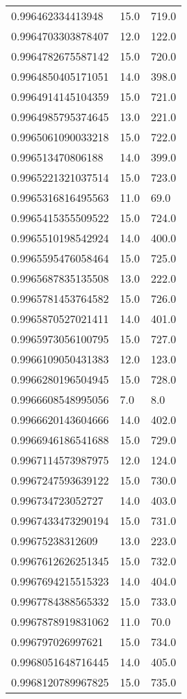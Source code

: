 \begin{center}
\begin{supertabular}[H]{p{0.30\textwidth}p{0.05\textwidth}p{0.05\textwidth}}
0.996462334413948 & 15.0 & 719.0 \\ 
0.9964703303878407 & 12.0 & 122.0 \\ 
0.9964782675587142 & 15.0 & 720.0 \\ 
0.9964850405171051 & 14.0 & 398.0 \\ 
0.9964914145104359 & 15.0 & 721.0 \\ 
0.9964985795374645 & 13.0 & 221.0 \\ 
0.9965061090033218 & 15.0 & 722.0 \\ 
0.996513470806188 & 14.0 & 399.0 \\ 
0.9965221321037514 & 15.0 & 723.0 \\ 
0.9965316816495563 & 11.0 & 69.0 \\ 
0.9965415355509522 & 15.0 & 724.0 \\ 
0.9965510198542924 & 14.0 & 400.0 \\ 
0.9965595476058464 & 15.0 & 725.0 \\ 
0.9965687835135508 & 13.0 & 222.0 \\ 
0.9965781453764582 & 15.0 & 726.0 \\ 
0.9965870527021411 & 14.0 & 401.0 \\ 
0.9965973056100795 & 15.0 & 727.0 \\ 
0.9966109050431383 & 12.0 & 123.0 \\ 
0.9966280196504945 & 15.0 & 728.0 \\ 
0.9966608548995056 & 7.0 & 8.0 \\ 
0.9966620143604666 & 14.0 & 402.0 \\ 
0.9966946186541688 & 15.0 & 729.0 \\ 
0.9967114573987975 & 12.0 & 124.0 \\ 
0.9967247593639122 & 15.0 & 730.0 \\ 
0.996734723052727 & 14.0 & 403.0 \\ 
0.9967433473290194 & 15.0 & 731.0 \\ 
0.99675238312609 & 13.0 & 223.0 \\ 
0.9967612626251345 & 15.0 & 732.0 \\ 
0.9967694215515323 & 14.0 & 404.0 \\ 
0.9967784388565332 & 15.0 & 733.0 \\ 
0.9967878919831062 & 11.0 & 70.0 \\ 
0.996797026997621 & 15.0 & 734.0 \\ 
0.9968051648716445 & 14.0 & 405.0 \\ 
0.9968120789967825 & 15.0 & 735.0 \\ 

\end{supertabular}
\end{center}
